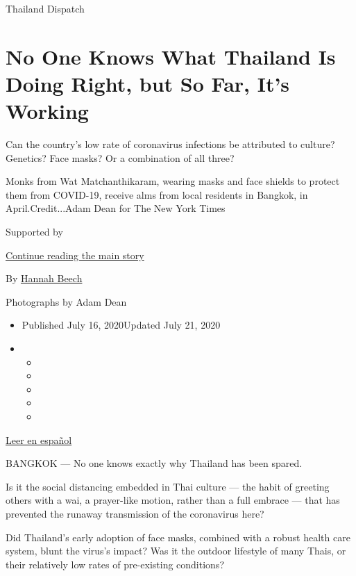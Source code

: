 Thailand Dispatch

\hypertarget{no-one-knows-what-thailand-is-doing-right-but-so-far-its-working}{%
\section{No One Knows What Thailand Is Doing Right, but So Far, It's
Working}\label{no-one-knows-what-thailand-is-doing-right-but-so-far-its-working}}

Can the country's low rate of coronavirus infections be attributed to
culture? Genetics? Face masks? Or a combination of all three?

Monks from Wat Matchanthikaram, wearing masks and face shields to
protect them from COVID-19, receive alms from local residents in
Bangkok, in April.Credit...Adam Dean for The New York Times

Supported by

\protect\hyperlink{after-sponsor}{Continue reading the main story}

By \href{https://www.nytimes.com/by/hannah-beech}{Hannah Beech}

Photographs by Adam Dean

\begin{itemize}
\item
  Published July 16, 2020Updated July 21, 2020
\item
  \begin{itemize}
  \item
  \item
  \item
  \item
  \item
  \end{itemize}
\end{itemize}

\href{https://www.nytimes.com/es/2020/07/21/espanol/mundo/coronavirus-tailandia.html}{Leer
en español}

BANGKOK --- No one knows exactly why Thailand has been spared.

Is it the social distancing embedded in Thai culture --- the habit of
greeting others with a wai, a prayer-like motion, rather than a full
embrace --- that has prevented the runaway transmission of the
coronavirus here?

Did Thailand's early adoption of face masks, combined with a robust
health care system, blunt the virus's impact? Was it the outdoor
lifestyle of many Thais, or their relatively low rates of pre-existing
conditions?

